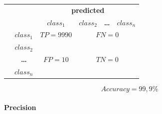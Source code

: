 \documentclass[10pt]{article}
\newif\ifen
\newif\ifde
\newcommand{\en}[1]{\ifen#1\fi}
\newcommand{\de}[1]{\ifde#1\fi}
\begin{document}
				\begin{table}[htb]
					\centering
					{\def\arraystretch{2}\tabcolsep=5pt
						\begin{tabular}{cc|c|c|c|c|}
							\cline{3-6}
							& & \multicolumn{4}{c|}{\textbf{predicted}} \\ \cline{3-6} 
							& & \boldmath\(class_1\) & \boldmath\(class_2\) & \textbf{\ldots} & \boldmath\(class_n\) \\ \hline
							\multicolumn{1}{|l|}{\multirow{4}{*}{\rotatebox{90}{\textbf{actual}}}} & \boldmath\(class_1\) & \(TP = 9990\)                  & \multicolumn{3}{c|}{\(FN = 0\)} \\ \cline{2-6} 
							\multicolumn{1}{|c|}{} & \boldmath\(class_2\) & \multirow{3}{*}{\(FP = 10\)} & \multicolumn{3}{c|}{\multirow{3}{*}{\(TN = 0\)}} \\ \cline{2-2}
							\multicolumn{1}{|c|}{} & \textbf{\ldots} & & \multicolumn{3}{c|}{}                   \\ \cline{2-2}
							\multicolumn{1}{|c|}{} & \boldmath\(class_n\) & & \multicolumn{3}{c|}{}                   \\ \hline
						\end{tabular}
					}
					\label{tbl:table_confusion_matrix}
				\end{table}

				\de{Die Modell-Genauigkeit ist ein ist in diesem Fall 99,9\%, obwohl es ein schlechtes Modell ist:}
				\en{The model accuracy in this case is 99.9\%, although it is a bad model:}

				\begin{equation}
					Accuracy = 99,9\%
				\end{equation}

				\de{Deswegen gibt es weitere Performance Metriken wie Precision, Recall und F-Measure.}
				\en{Therefore there are additional performance metrics like Precision, Recall and F-Measure.}

			\paragraph{Precision}
				\de{Precision\footnote{``Precision and recall'', Wikipedia contributors, February 7, 2020, \url{https://en.wikipedia.org/wiki/Precision_and_recall}} sagt aus, wie zuverlässig die Aussage einer Vorhersage einer Klasse ist:}
				\en{Precision\footnote{``Precision and recall'', Wikipedia contributors, February 7, 2020, \url{https://en.wikipedia.org/wiki/Precision_and_recall}} expresses how reliable the statement of a prediction of a class is:}
\end{document}
